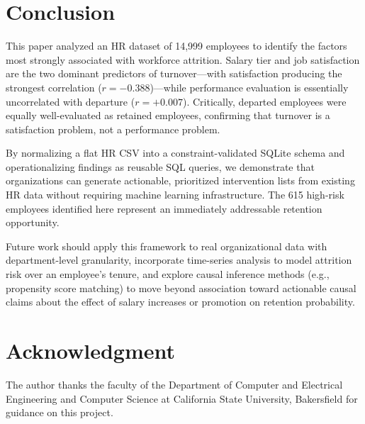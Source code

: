 \documentclass[conference]{IEEEtran}
\begin{document}
\section{Conclusion}
\label{sec:conclusion}

This paper analyzed an HR dataset of 14,999 employees to identify the factors
most strongly associated with workforce attrition. Salary tier and job
satisfaction are the two dominant predictors of turnover---with satisfaction
producing the strongest correlation ($r = -0.388$)---while performance
evaluation is essentially uncorrelated with departure ($r = +0.007$).
Critically, departed employees were equally well-evaluated as retained
employees, confirming that turnover is a satisfaction problem, not a
performance problem.

By normalizing a flat HR CSV into a constraint-validated SQLite schema and
operationalizing findings as reusable SQL queries, we demonstrate that
organizations can generate actionable, prioritized intervention lists from
existing HR data without requiring machine learning infrastructure. The 615
high-risk employees identified here represent an immediately addressable
retention opportunity.

Future work should apply this framework to real organizational data with
department-level granularity, incorporate time-series analysis to model
attrition risk over an employee's tenure, and explore causal inference
methods (e.g., propensity score matching) to move beyond association toward
actionable causal claims about the effect of salary increases or promotion on
retention probability.

\section*{Acknowledgment}

The author thanks the faculty of the Department of Computer and Electrical
Engineering and Computer Science at California State University, Bakersfield
for guidance on this project.
\end{document}
